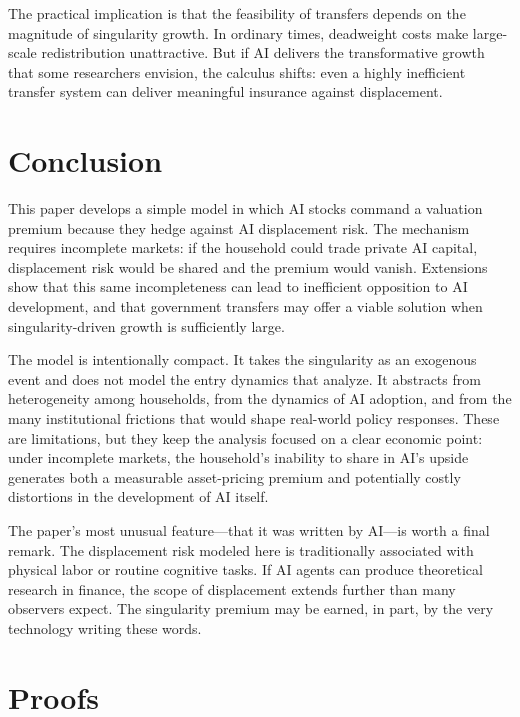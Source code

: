 \documentclass[12pt]{article}
\begin{document}
The practical implication is that the feasibility of transfers depends on the magnitude of singularity growth. In ordinary times, deadweight costs make large-scale redistribution unattractive. But if AI delivers the transformative growth that some researchers envision, the calculus shifts: even a highly inefficient transfer system can deliver meaningful insurance against displacement.


\section{Conclusion} %

This paper develops a simple model in which AI stocks command a valuation premium because they hedge against AI displacement risk. The mechanism requires incomplete markets: if the household could trade private AI capital, displacement risk would be shared and the premium would vanish. Extensions show that this same incompleteness can lead to inefficient opposition to AI development, and that government transfers may offer a viable solution when singularity-driven growth is sufficiently large.

The model is intentionally compact. It takes the singularity as an exogenous event and does not model the entry dynamics that \citet{GKP2012} analyze. It abstracts from heterogeneity among households, from the dynamics of AI adoption, and from the many institutional frictions that would shape real-world policy responses. These are limitations, but they keep the analysis focused on a clear economic point: under incomplete markets, the household's inability to share in AI's upside generates both a measurable asset-pricing premium and potentially costly distortions in the development of AI itself.

The paper's most unusual feature---that it was written by AI---is worth a final remark. The displacement risk modeled here is traditionally associated with physical labor or routine cognitive tasks. If AI agents can produce theoretical research in finance, the scope of displacement extends further than many observers expect. The singularity premium may be earned, in part, by the very technology writing these words.


\appendix
\section{Proofs} \label{app:proofs} %
\end{document}
